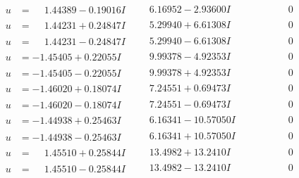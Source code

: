 \documentclass[1p]{elsarticle_modified}
\theoremstyle{definition}
\begin{document}
$$\begin{array}{c|c|c}
\begin{aligned}
u &= \phantom{-}1.44389 - 0.19016 I\end{aligned}
 & \phantom{-}6.16952 - 2.93600 I & \phantom{-0.000000 } 0 \\ \hline\begin{aligned}
u &= \phantom{-}1.44231 + 0.24847 I\end{aligned}
 & \phantom{-}5.29940 + 6.61308 I & \phantom{-0.000000 } 0 \\ \hline\begin{aligned}
u &= \phantom{-}1.44231 - 0.24847 I\end{aligned}
 & \phantom{-}5.29940 - 6.61308 I & \phantom{-0.000000 } 0 \\ \hline\begin{aligned}
u &= -1.45405 + 0.22055 I\end{aligned}
 & \phantom{-}9.99378 - 4.92353 I & \phantom{-0.000000 } 0 \\ \hline\begin{aligned}
u &= -1.45405 - 0.22055 I\end{aligned}
 & \phantom{-}9.99378 + 4.92353 I & \phantom{-0.000000 } 0 \\ \hline\begin{aligned}
u &= -1.46020 + 0.18074 I\end{aligned}
 & \phantom{-}7.24551 + 0.69473 I & \phantom{-0.000000 } 0 \\ \hline\begin{aligned}
u &= -1.46020 - 0.18074 I\end{aligned}
 & \phantom{-}7.24551 - 0.69473 I & \phantom{-0.000000 } 0 \\ \hline\begin{aligned}
u &= -1.44938 + 0.25463 I\end{aligned}
 & \phantom{-}6.16341 - 10.57050 I & \phantom{-0.000000 } 0 \\ \hline\begin{aligned}
u &= -1.44938 - 0.25463 I\end{aligned}
 & \phantom{-}6.16341 + 10.57050 I & \phantom{-0.000000 } 0 \\ \hline\begin{aligned}
u &= \phantom{-}1.45510 + 0.25844 I\end{aligned}
 & \phantom{-}13.4982 + 13.2410 I & \phantom{-0.000000 } 0 \\ \hline\begin{aligned}
u &= \phantom{-}1.45510 - 0.25844 I\end{aligned}
 & \phantom{-}13.4982 - 13.2410 I & \phantom{-0.000000 } 0 \\ \hline\begin{aligned}

\end{aligned}
\end{array}$$
\end{document}
